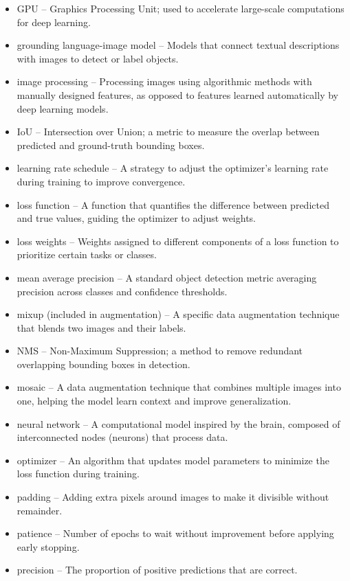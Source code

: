 \documentclass[12pt,a4paper]{article}
\begin{document}
\begin{itemize}
    \item GPU – Graphics Processing Unit; used to accelerate large-scale computations for deep learning.
    \item grounding language-image model – Models that connect textual descriptions with images to detect or label objects.
    \item image processing – Processing images using algorithmic methods with manually designed features, as opposed to features learned automatically by deep learning models.
    \item IoU – Intersection over Union; a metric to measure the overlap between predicted and ground-truth bounding boxes.
    \item learning rate schedule – A strategy to adjust the optimizer’s learning rate during training to improve convergence.
    \item loss function – A function that quantifies the difference between predicted and true values, guiding the optimizer to adjust weights.  
    \item loss weights – Weights assigned to different components of a loss function to prioritize certain tasks or classes.
    \item mean average precision – A standard object detection metric averaging precision across classes and confidence thresholds.
    \item mixup (included in augmentation) – A specific data augmentation technique that blends two images and their labels.
    \item NMS – Non-Maximum Suppression; a method to remove redundant overlapping bounding boxes in detection.
    \item mosaic – A data augmentation technique that combines multiple images into one, helping the model learn context and improve generalization.  
    \item neural network – A computational model inspired by the brain, composed of interconnected nodes (neurons) that process data.
    \item optimizer – An algorithm that updates model parameters to minimize the loss function during training.
    \item padding – Adding extra pixels around images to make it divisible without remainder.  
    \item patience – Number of epochs to wait without improvement before applying early stopping.
    \item precision – The proportion of positive predictions that are correct.

\end{itemize}
\end{document}
